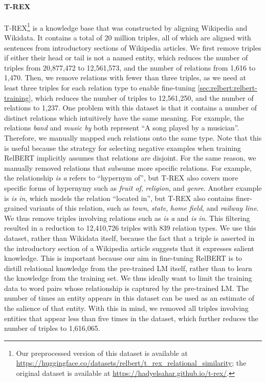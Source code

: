 \documentclass[3p]{elsarticle}
\begin{document}
{\paragraph{T-REX}\label{sec:relbert:trex}
T-REX\footnote{Our preprocessed version of this dataset is available at \url{https://huggingface.co/datasets/relbert/t_rex_relational_similarity}; the original dataset is available at \url{https://hadyelsahar.github.io/t-rex/}.} \cite{elsahar-etal-2018-rex} is a knowledge base that was constructed by aligning Wikipedia and Wikidata. It contains a total of 20 million triples, all of which are aligned with sentences from introductory sections of Wikipedia articles. We first remove triples if either their head or tail is not a named entity, which reduces the number of triples from 20,877,472 to 12,561,573, and the number of relations from 1,616 to 1,470. Then, we remove relations with fewer than three triples, as we need at least three triples for each relation type to enable fine-tuning \autoref{sec:relbert:relbert-training}, which reduces the number of triples to 12,561,250, and the number of relations to 1,237. One problem with this dataset is that it contains a number of distinct relations which intuitively have the same meaning. For example, the relations \emph{band} and \emph{music by} both represent ``A song played by a musician''. Therefore, we manually mapped such relations onto the same type. Note that this is useful because the strategy for selecting negative examples when training RelBERT implicitly assumes that relations are disjoint. For the same reason, we manually removed relations that subsume more specific relations. 
For example, the relationship \emph{is a} refers to ``hypernym of'', but T-REX also covers more specific forms of hypernymy such as \emph{fruit of}, \emph{religion}, and \emph{genre}. Another example is \emph{is in}, which models the relation ``located in'', but T-REX also contains finer-grained variants of this relation, such as \emph{town}, \emph{state}, \emph{home field}, and \emph{railway line}. We thus remove triples involving relations such as \emph{is a} and \emph{is in}.
This filtering resulted in a reduction to 12,410,726 triples with 839 relation types. We use this dataset, rather than Wikidata itself, because the fact that a triple is asserted in the introductory section of a Wikipedia article suggests that it expresses salient knowledge. This is important because our aim in fine-tuning RelBERT is to distill relational knowledge from the pre-trained LM itself, rather than to learn the knowledge from the training set. We thus ideally want to limit the training data to word pairs whose relationship is captured by the pre-trained LM. The number of times an entity appears in this dataset can be used as an estimate of the salience of that entity. With this in mind, we removed all triples involving entities that appear less than five times in the dataset, which further reduces the number of triples to 1,616,065. 
}
\end{document}
